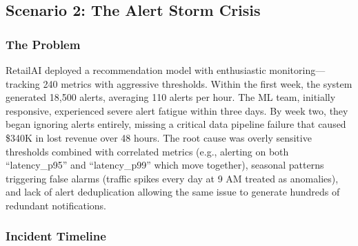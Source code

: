 \subsection{Scenario 2: The Alert Storm Crisis}

\subsubsection{The Problem}

RetailAI deployed a recommendation model with enthusiastic monitoring---tracking 240 metrics with aggressive thresholds. Within the first week, the system generated 18,500 alerts, averaging 110 alerts per hour. The ML team, initially responsive, experienced severe alert fatigue within three days. By week two, they began ignoring alerts entirely, missing a critical data pipeline failure that caused \$340K in lost revenue over 48 hours. The root cause was overly sensitive thresholds combined with correlated metrics (e.g., alerting on both ``latency\_p95'' and ``latency\_p99'' which move together), seasonal patterns triggering false alarms (traffic spikes every day at 9 AM treated as anomalies), and lack of alert deduplication allowing the same issue to generate hundreds of redundant notifications.

\subsubsection{Incident Timeline}

